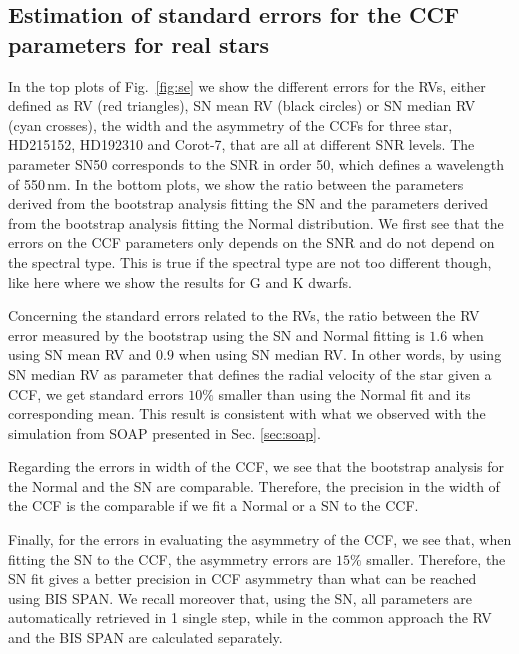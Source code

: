 \documentclass[11pt, oneside]{article}
\begin{document}
\subsection{Estimation of standard errors for the CCF parameters for real stars} \label{sec:bootstrap_real_star}
In the top plots of Fig.~\ref{fig:se} we show the different errors for the RVs, either defined as RV (red triangles), SN mean RV (black circles) or SN median RV (cyan crosses), the width and the asymmetry of the CCFs for three star, HD215152, HD192310 and Corot-7, that are all at different SNR levels. The parameter SN50 corresponds to the SNR in order 50, which defines a wavelength of 550\,nm. In the bottom plots, we show the ratio between the parameters derived from the bootstrap analysis fitting the SN and the parameters derived from the bootstrap analysis fitting the Normal distribution. We first see that the errors on the CCF parameters only depends on the SNR and do not depend on the spectral type. This is true if the spectral type are not too different though, like here where we show the results for G and K dwarfs.

Concerning the standard errors related to the RVs, the ratio between the RV error measured by the bootstrap using the SN and Normal fitting is $1.6$ when using SN mean RV and $0.9$ when using SN median RV. In other words, by using SN median RV as parameter that defines the radial velocity of the star given a CCF, we get standard errors $10\%$ smaller than using the Normal fit and its corresponding mean. This result is consistent with what we observed with the simulation from SOAP presented in Sec. \ref{sec:soap}.

Regarding the errors in width of the CCF, we see that the bootstrap analysis for the Normal and the SN are comparable. Therefore, the precision in the width of the CCF is the comparable if we fit a Normal or a SN to the CCF.

Finally, for the errors in evaluating the asymmetry of the CCF, we see that, when fitting the SN to the CCF, the asymmetry errors are $15\%$ smaller. Therefore, the SN fit gives a better precision in CCF asymmetry than what can be reached using BIS SPAN. We recall moreover that, using the SN, all parameters are automatically retrieved in 1 single step, while in the common approach the RV and the BIS SPAN are calculated separately.
\end{document}
